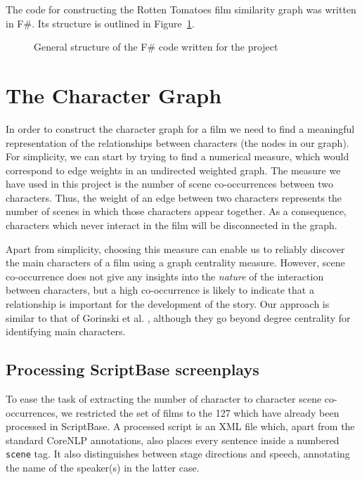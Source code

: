 \documentclass[bsc,frontabs,deptreport,singlespacing,parskip, twoside]{infthesis}
\begin{document}
The code for constructing the Rotten Tomatoes film similarity graph was written in F\#. Its structure is outlined in Figure~\ref{fig:fsharpdirtree}.

\begin{figure}[th!]
\caption{General structure of the F\# code written for the project}
\label{fig:fsharpdirtree}
\end{figure}

\section{The Character Graph}
In order to construct the character graph for a film we need to find a meaningful representation of the relationships between characters (the nodes in our graph). For simplicity, we can start by trying to find a numerical measure, which would correspond to edge weights in an undirected weighted graph. The measure we have used in this project is the number of scene co-occurrences between two characters. Thus, the weight of an edge between two characters represents the number of scenes in which those characters appear together. As a consequence, characters which never interact in the film will be disconnected in the graph. 

Apart from simplicity, choosing this measure can enable us to reliably discover the main characters of a film using a graph centrality measure. However, scene co-occurrence does not give any insights into the \textit{nature} of the interaction between characters, but a high co-occurrence is likely to indicate that a relationship is important for the development of the story. Our approach is similar to that of Gorinski et al. \cite{Gorinski2015}, although they go beyond degree centrality for identifying main characters.

\subsection{Processing ScriptBase screenplays}
\label{sec:processing_scriptbase}
To ease the task of extracting the number of character to character scene co-occurrences, we restricted the set of films to the 127 which have already been processed in ScriptBase. A processed script is an XML file which, apart from the standard CoreNLP annotations, also places every sentence inside a numbered \texttt{scene} tag. It also distinguishes between stage directions and speech, annotating the name of the speaker(s) in the latter case.
\end{document}
